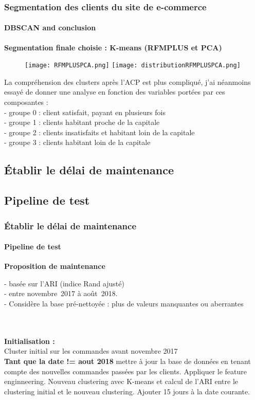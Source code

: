 \documentclass{beamer}
\begin{document}
\begin{frame}


\frametitle{Segmentation des clients du site de e-commerce}
	\framesubtitle{DBSCAN and conclusion}
\textbf{Segmentation finale choisie : K-means (RFMPLUS et PCA)}
\begin{figure}
    \centering
    \texttt{[image: RFMPLUSPCA.png]}
    \texttt{[image: distributionRFMPLUSPCA.png]}
\end{figure}
La compréhension des clusters après l'ACP est plus compliqué, j'ai néanmoins essayé de donner une analyse en fonction des variables portées par ces composantes : \\
- groupe 0 : client satisfait, payant en plusieurs fois  \\
- groupe 1 : clients habitant proche de la capitale  \\
- groupe 2 : clients insatisfaits et habitant loin de la capitale  \\
- groupe 3 : clients habitant loin de la capitale \\

\end{frame}




\begin{frame}

\section{Établir le délai de maintenance}
    \subsection{Pipeline de test }
    \frametitle{Établir le délai de maintenance}
	\framesubtitle{Pipeline de test}

\textbf{Proposition de maintenance} \\
\begin{center}
    

- basée sur l’ARI (indice Rand ajusté) \\ 
- entre novembre 2017 à août 2018. \\
- Considère la base pré-nettoyée : plus de valeurs manquantes ou aberrantes\\
\end{center} \\
 \\
\textbf{Initialisation : } \\Cluster initial sur les commandes avant novembre 2017 \\

\textbf{Tant que la date != aout 2018} mettre à jour la base de données en tenant compte des nouvelles commandes passées par les clients. Appliquer le feature enginneering. Nouveau clustering avec K-means et calcul de l'ARI entre le clustering initial et le nouveau clustering.
Ajouter 15 jours à la date courante. 

\end{frame}
\end{document}
